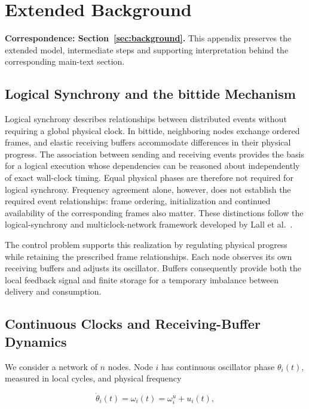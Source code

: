 \section{Extended Background}
\label{app:background}
\noindent\textbf{Correspondence: Section~\ref{sec:background}.} This appendix preserves the extended model, intermediate steps and supporting interpretation behind the corresponding main-text section.


\label{detail:sec:background}

\subsection{Logical Synchrony and the bittide Mechanism}

Logical synchrony describes relationships between distributed events without requiring a global physical clock. In bittide, neighboring nodes exchange ordered frames, and elastic receiving buffers accommodate differences in their physical progress. The association between sending and receiving events provides the basis for a logical execution whose dependencies can be reasoned about independently of exact wall-clock timing. Equal physical phases are therefore not required for logical synchrony. Frequency agreement alone, however, does not establish the required event relationships: frame ordering, initialization and continued availability of the corresponding frames also matter. These distinctions follow the logical-synchrony and multiclock-network framework developed by Lall et al.~\cite{lall2024logicalSynchrony}.

The control problem supports this realization by regulating physical progress while retaining the prescribed frame relationships. Each node observes its own receiving buffers and adjusts its oscillator. Buffers consequently provide both the local feedback signal and finite storage for a temporary imbalance between delivery and consumption.

\subsection{Continuous Clocks and Receiving-Buffer Dynamics}

We consider a network of $n$ nodes. Node $i$ has continuous oscillator phase $\theta_i(t)$, measured in local cycles, and physical frequency

\begin{equation}
\dot\theta_i(t)=\omega_i(t)=\omega_i^u+u_i(t),
\end{equation}


